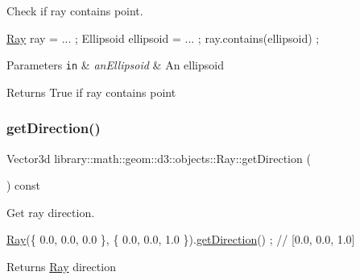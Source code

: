 Check if ray contains point. 


\begin{DoxyCode}
\hyperlink{classlibrary_1_1math_1_1geom_1_1d3_1_1objects_1_1_ray_a11b7613464daaebc6e25a758b057f203}{Ray} ray = ... ;
Ellipsoid ellipsoid = ... ;
ray.contains(ellipsoid) ;
\end{DoxyCode}



\begin{DoxyParams}[1]{Parameters}
\mbox{\tt in}  & {\em an\+Ellipsoid} & An ellipsoid \\
\hline
\end{DoxyParams}
\begin{DoxyReturn}{Returns}
True if ray contains point 
\end{DoxyReturn}
\mbox{\label{classlibrary_1_1math_1_1geom_1_1d3_1_1objects_1_1_ray_ab2e0a6cfd7c2c288ec615a479024fb7d}} 
\subsubsection{\texorpdfstring{get\+Direction()}{getDirection()}}
{\footnotesize\ttfamily Vector3d library\+::math\+::geom\+::d3\+::objects\+::\+Ray\+::get\+Direction (\begin{DoxyParamCaption}{ }\end{DoxyParamCaption}) const}



Get ray direction. 


\begin{DoxyCode}
\hyperlink{classlibrary_1_1math_1_1geom_1_1d3_1_1objects_1_1_ray_a11b7613464daaebc6e25a758b057f203}{Ray}(\{ 0.0, 0.0, 0.0 \}, \{ 0.0, 0.0, 1.0 \}).\hyperlink{classlibrary_1_1math_1_1geom_1_1d3_1_1objects_1_1_ray_ab2e0a6cfd7c2c288ec615a479024fb7d}{getDirection}() ; \textcolor{comment}{// [0.0, 0.0, 1.0]}
\end{DoxyCode}


\begin{DoxyReturn}{Returns}
\hyperlink{classlibrary_1_1math_1_1geom_1_1d3_1_1objects_1_1_ray}{Ray} direction 
\end{DoxyReturn}
\mbox{\label{classlibrary_1_1math_1_1geom_1_1d3_1_1objects_1_1_ray_abaac9b7fcc10e2076ada11f2798386bd}} 
